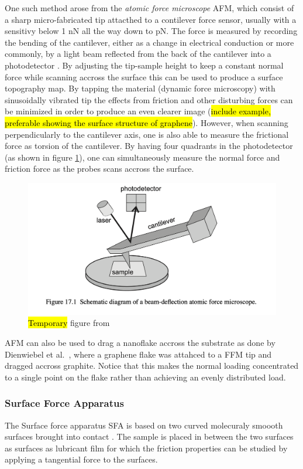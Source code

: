 One such method arose from the \textit{atomic force microscope} \acrshort{AFM}, which consist
of a sharp micro-fabricated tip attacthed to a contilever force sensor, usually
with a sensitivy below 1 nN all the way down to pN. The force is measured by recording the bending of
the cantilever, either as a change in electrical conduction or more commonly, by
a light beam reflected from the back of the cantilever into a photodetector
\cite[p. 183]{gnecco_meyer_2015}. By adjusting the tip-sample height to keep a constant
normal force while scanning accross the surface this can be used to produce a
surface topography map. By tapping the material (dynamic force microscopy) with
sinusoidally vibrated tip the effects from friction and other disturbing forces
can be minimized in order to produce an even clearer image (\hl{include example,
preferable showing the surface structure of graphene}). However, when scanning
perpendicularly to the cantilever axis, one is also able to measure the
frictional force as torsion of the cantilever. By having four quadrants in the
photodetector (as shown in figure \cref{fig:AFM}), one can simultaneously
measure the normal force and friction force as the probes scans accross the
surface. 

\begin{figure}[H]
  \centering
  \includegraphics[width=0.6\linewidth]{figures/theory/AFM.png}
  \caption{\hl{Temporary} figure from \cite[p. 184]{gnecco_meyer_2015}}
  \label{fig:AFM}
\end{figure}


\acrshort{AFM} can also be used to drag a nanoflake accross the substrate as done by
Dienwiebel et al.\ \cite{DIENWIEBEL2005197}, where a graphene flake was attahced
to a \acrshort{FFM} tip and dragged accross graphite. Notice that this makes the normal
loading concentrated to a single point on the flake rather than achieving an evenly distributed load. 



\subsubsection{Surface Force Apparatus}
The Surface force apparatus \acrshort{SFA} is based on two curved molecuraly smoooth surfaces brought into contact \cite[p. 188]{gnecco_meyer_2015}. The sample is placed in between the two surfaces as surfaces as lubricant film for which the friction properties can be studied by applying a tangential force to the surfaces. 



